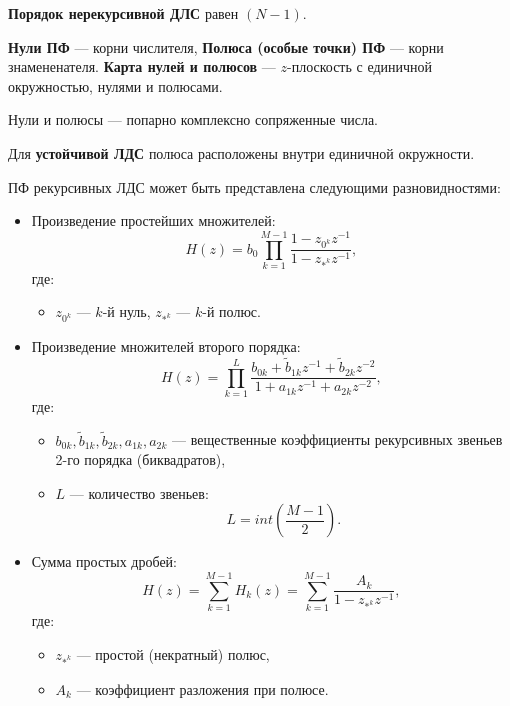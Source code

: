 \documentclass[a4paper, 14pt]{extarticle}
\begin{document}
\textbf{Порядок нерекурсивной ДЛС} равен $(N-1)$.

\textbf{Нули ПФ} --- корни числителя, \textbf{Полюса (особые точки) ПФ} --- корни знамененателя. \textbf{Карта нулей и полюсов} --- $z$-плоскость с единичной окружностью, нулями и полюсами.

Нули и полюсы --- попарно комплексно сопряженные числа.

Для \textbf{устойчивой ЛДС} полюса расположены внутри единичной окружности.

ПФ рекурсивных ЛДС может быть представлена следующими разновидностями:
\begin{itemize}
    \item Произведение простейших множителей:
        \begin{equation}
            H(z) = b_0 \prod^{M-1}_{k=1} \frac{1 - z_{0^k}z^{-1}}{1-z_{*^k}z^{-1}},
        \end{equation}
        где:
        \begin{itemize}
            \item $z_{0^k}$ --- $k$-й нуль, $z_{*^k}$ --- $k$-й полюс.
        \end{itemize}
    \item Произведение множителей второго порядка:
        \begin{equation}
            H(z) = \prod^{L}_{k=1} \frac{b_{0k} + \tilde{b}_{1k} z^{-1} + \tilde{b}_{2k}z^{-2}}{1 + a_{1k} z^{-1} + a_{2k} z^{-2}},
        \end{equation}
        где:
        \begin{itemize}
            \item $b_{0k}, \tilde{b}_{1k}, \tilde{b}_{2k}, a_{1k}, a_{2k}$ --- вещественные коэффициенты рекурсивных звеньев 2-го порядка (биквадратов),
            \item $L$ --- количество звеньев:
                \begin{equation}
                L = int( \frac{M-1}{2} ).
                \end{equation}
        \end{itemize}
    \item Сумма простых дробей:
        \begin{equation}
            H(z) = \sum^{M-1}_{k=1} H_k(z) = \sum^{M-1}_{k=1} \frac{A_k}{1-z_{*^k}z^{-1}}, 
        \end{equation}
        где:
        \begin{itemize}
            \item $z_{*^k}$ --- простой (некратный) полюс,
            \item $A_k$ --- коэффициент разложения при полюсе.
        \end{itemize}
\end{itemize}
\end{document}
